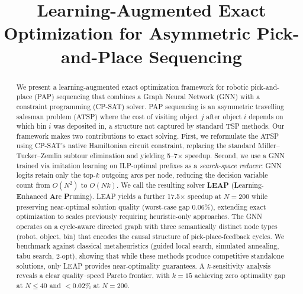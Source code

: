 \documentclass[conference]{IEEEtran}
\begin{document}
\title{\textbf{Learning-Augmented Exact Optimization for Asymmetric Pick-and-Place Sequencing}}

\author{
\and
{}
\and
{}
}

\maketitle

\begin{abstract}
We present a learning-augmented exact optimization framework for robotic pick-and-place (PAP) sequencing that combines a Graph Neural Network (GNN) with a constraint programming (CP-SAT) solver. PAP sequencing is an asymmetric travelling salesman problem (ATSP) where the cost of visiting object $j$ after object $i$ depends on which bin $i$ was deposited in, a structure not captured by standard TSP methods. Our framework makes two contributions to exact solving. First, we reformulate the ATSP using CP-SAT's native Hamiltonian circuit constraint, replacing the standard Miller--Tucker--Zemlin subtour elimination and yielding 5--7$\times$ speedup. Second, we use a GNN trained via imitation learning on ILP-optimal prefixes as a \emph{search-space reducer}: GNN logits retain only the top-$k$ outgoing arcs per node, reducing the decision variable count from $O(N^2)$ to $O(Nk)$. We call the resulting solver \textbf{LEAP} (\textbf{L}earning-\textbf{E}nhanced \textbf{A}rc \textbf{P}runing). LEAP yields a further 17.5$\times$ speedup at $N{=}200$ while preserving near-optimal solution quality (worst-case gap 0.06\%), extending exact optimization to scales previously requiring heuristic-only approaches. The GNN operates on a cycle-aware directed graph with three semantically distinct node types (robot, object, bin) that encodes the causal structure of pick-place-feedback cycles. We benchmark against classical metaheuristics (guided local search, simulated annealing, tabu search, 2-opt), showing that while these methods produce competitive standalone solutions, only LEAP provides near-optimality guarantees. A $k$-sensitivity analysis reveals a clear quality--speed Pareto frontier, with $k{=}15$ achieving zero optimality gap at $N{\le}40$ and $<$0.02\% at $N{=}200$.
\end{abstract}
\end{document}
